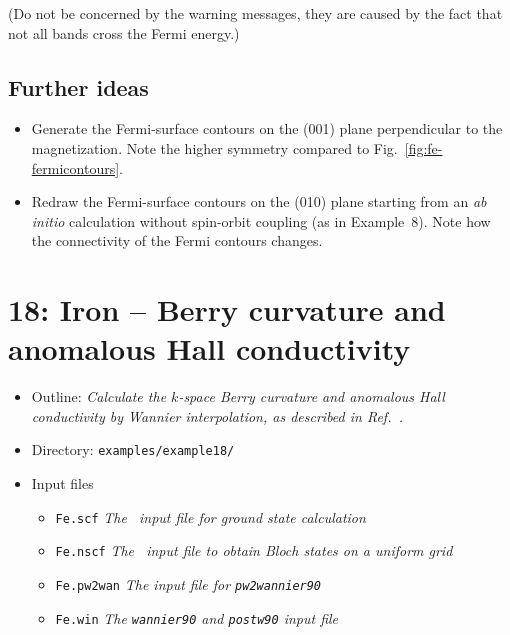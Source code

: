\documentclass[a4paper,11pt,twoside]{article}
\begin{document}
(Do not be concerned by the warning messages, they are caused by the fact that
not all bands cross the Fermi energy.)
%



\subsection*{Further ideas}

\begin{itemize}


\item Generate the Fermi-surface contours on the (001) plane
perpendicular to the magnetization. Note the higher symmetry compared
to Fig.~\ref{fig:fe-fermicontours}.

\item Redraw the Fermi-surface contours on the (010) plane starting
  from an {\it ab initio} calculation without spin-orbit coupling (as
  in Example~8). Note how the connectivity of the Fermi contours
  changes.

\end{itemize}

\cleardoublepage

\section*{18: Iron -- Berry curvature and anomalous Hall 
conductivity}

\begin{itemize}
\item{Outline: \it{Calculate the $k$-space Berry curvature and
      anomalous Hall conductivity by Wannier interpolation, as
      described in Ref.~\cite{wang-prb06}.}}
\item{Directory: {\tt examples/example18/}}
\item{Input files}
\begin{itemize}
\item{ {\tt Fe.scf} {\it The \pwscf\ input file for ground state
    calculation}}
\item{ {\tt Fe.nscf}  {\it The \pwscf\ input file to obtain Bloch
    states on a uniform grid}} 
\item{ {\tt Fe.pw2wan}  {\it The input file for {\tt pw2wannier90}}}
\item{ {\tt Fe.win}  {\it The {\tt wannier90} and {\tt postw90} input file}}
\end{itemize}
\end{itemize}
\end{document}
